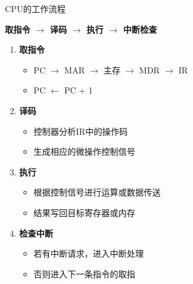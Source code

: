 \documentclass[10pt, aspectratio=169]{beamer}
\begin{document}
\begin{frame}{CPU的工作流程}
    \begin{center}
        \textbf{取指令 $\rightarrow$ 译码 $\rightarrow$ 执行 $\rightarrow$ 中断检查}
    \end{center}
    \vspace{0.5em}
    \begin{enumerate}
        \item \textbf{取指令}
            \begin{itemize}
                \item PC $\rightarrow$ MAR $\rightarrow$ 主存 $\rightarrow$ MDR $\rightarrow$ IR
                \item PC $\leftarrow$ PC + 1
            \end{itemize}
        \item \textbf{译码}
            \begin{itemize}
                \item 控制器分析IR中的操作码
                \item 生成相应的微操作控制信号
            \end{itemize}
        \item \textbf{执行}
            \begin{itemize}
                \item 根据控制信号进行运算或数据传送
                \item 结果写回目标寄存器或内存
            \end{itemize}
        \item \textbf{检查中断}
            \begin{itemize}
                \item 若有中断请求，进入中断处理
                \item 否则进入下一条指令的取指
            \end{itemize}
    \end{enumerate}
\end{frame}
\end{document}
